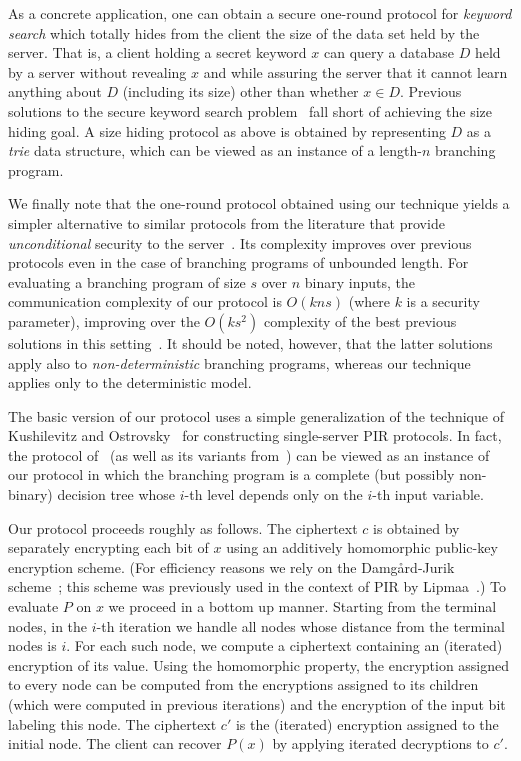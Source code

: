 \documentclass{article}
\newcommand{\superparagraph}[1]{\medskip\noindent {\bf #1}}
\begin{document}
As a concrete application, one can obtain a secure one-round
protocol for {\em keyword search} which totally hides from the
client the size of the data set held by the server. That is, a
client holding a secret keyword $x$ can query a database $D$ held by
a server without revealing $x$ and while assuring the server that it
cannot learn anything about $D$ (including its size) other than
whether $x\in D$. Previous solutions to the secure keyword search
problem~\cite{CGN,FIPR05,OS} fall short of achieving the size hiding
goal. A size hiding protocol as above is obtained by representing
$D$ as a {\em trie} data structure, which can be viewed as an
instance of a length-$n$ branching program.

We finally note that the one-round protocol obtained using our
technique yields a simpler alternative to similar protocols from the
literature that provide {\em unconditional} security to the
server~\cite{syy99,beaver00,ik00,Rap,Kol}. Its complexity improves over
previous protocols even in the case of branching programs of
unbounded length. For evaluating a branching program of size $s$
over $n$ binary inputs, the communication complexity of our protocol
is $O(kns)$ (where $k$ is a security parameter), improving over the
$O(ks^2)$ complexity of the best previous solutions in this
setting~\cite{ik00}. It should be noted, however, that the latter
solutions apply also to {\em non-deterministic} branching programs,
whereas our technique applies only to the deterministic model.

\superparagraph{Techniques.} The basic version of our protocol uses
a simple generalization of the technique of Kushilevitz and
Ostrovsky~\cite{KO97} for constructing single-server PIR protocols.
In fact, the protocol of~\cite{KO97} (as well as its variants
from~\cite{Ste98,L04}) can be viewed as an instance of our protocol
in which the branching program is a complete (but possibly
non-binary) decision tree whose $i$-th level depends only on the
$i$-th input variable.

Our protocol proceeds roughly as follows. The ciphertext $c$ is
obtained by separately encrypting each bit of $x$ using an additively homomorphic public-key encryption scheme. (For efficiency reasons we
rely on the Damg{\aa}rd-Jurik scheme~\cite{DJ01}; this scheme was
previously used in the context of PIR by Lipmaa~\cite{L04}.) To
evaluate $P$ on $x$ we proceed in a bottom up manner. Starting from
the terminal nodes, in the $i$-th iteration we handle all nodes
whose distance from the terminal nodes is $i$. For each such node,
we compute a ciphertext containing an (iterated) encryption of its
value. Using the homomorphic property, the encryption assigned to
every node can be computed from the encryptions assigned to its
children (which were computed in previous iterations) and the
encryption of the input bit labeling this node.  The ciphertext $c'$
is the (iterated) encryption assigned to the initial node. The
client can recover $P(x)$ by applying iterated decryptions to $c'$.
\end{document}
